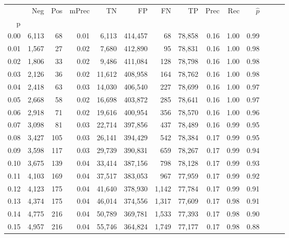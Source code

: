 \begin{tabular}{rrrrrrrrrrrrrr}
\toprule
{} &    Neg &    Pos & mPrec &       TN &       FP &      FN &      TP &  Prec &   Rec & $\hat{p}$ \\
p    &        &        &       &          &          &         &         &       &       &           \\
\midrule
0.00 &  6,113 &     68 &  0.01 &    6,113 &  414,457 &      68 &  78,858 &  0.16 &  1.00 &      0.99 \\
0.01 &  1,567 &     27 &  0.02 &    7,680 &  412,890 &      95 &  78,831 &  0.16 &  1.00 &      0.98 \\
0.02 &  1,806 &     33 &  0.02 &    9,486 &  411,084 &     128 &  78,798 &  0.16 &  1.00 &      0.98 \\
0.03 &  2,126 &     36 &  0.02 &   11,612 &  408,958 &     164 &  78,762 &  0.16 &  1.00 &      0.98 \\
0.04 &  2,418 &     63 &  0.03 &   14,030 &  406,540 &     227 &  78,699 &  0.16 &  1.00 &      0.97 \\
0.05 &  2,668 &     58 &  0.02 &   16,698 &  403,872 &     285 &  78,641 &  0.16 &  1.00 &      0.97 \\
0.06 &  2,918 &     71 &  0.02 &   19,616 &  400,954 &     356 &  78,570 &  0.16 &  1.00 &      0.96 \\
0.07 &  3,098 &     81 &  0.03 &   22,714 &  397,856 &     437 &  78,489 &  0.16 &  0.99 &      0.95 \\
0.08 &  3,427 &    105 &  0.03 &   26,141 &  394,429 &     542 &  78,384 &  0.17 &  0.99 &      0.95 \\
0.09 &  3,598 &    117 &  0.03 &   29,739 &  390,831 &     659 &  78,267 &  0.17 &  0.99 &      0.94 \\
0.10 &  3,675 &    139 &  0.04 &   33,414 &  387,156 &     798 &  78,128 &  0.17 &  0.99 &      0.93 \\
0.11 &  4,103 &    169 &  0.04 &   37,517 &  383,053 &     967 &  77,959 &  0.17 &  0.99 &      0.92 \\
0.12 &  4,123 &    175 &  0.04 &   41,640 &  378,930 &   1,142 &  77,784 &  0.17 &  0.99 &      0.91 \\
0.13 &  4,374 &    175 &  0.04 &   46,014 &  374,556 &   1,317 &  77,609 &  0.17 &  0.98 &      0.91 \\
0.14 &  4,775 &    216 &  0.04 &   50,789 &  369,781 &   1,533 &  77,393 &  0.17 &  0.98 &      0.90 \\
0.15 &  4,957 &    216 &  0.04 &   55,746 &  364,824 &   1,749 &  77,177 &  0.17 &  0.98 &      0.88 \\

\end{tabular}
